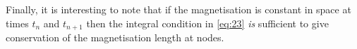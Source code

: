 Finally, it is interesting to note that if the magnetisation is constant in space at times $t_n$ and $t_{n+1}$ then the integral condition in \cref{eq:23} \emph{is} sufficient to give conservation of the magnetisation length at nodes.



